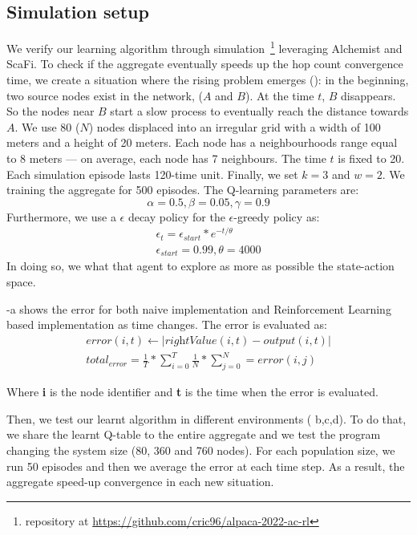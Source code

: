 \documentclass[conference]{IEEEtran}
\begin{document}
\subsection{Simulation setup}
We verify our learning algorithm through simulation~\footnote{repository at \url{https://github.com/cric96/alpaca-2022-ac-rl}} leveraging Alchemist and ScaFi.
 To check if the aggregate eventually speeds up the hop count convergence time, we create a situation where the rising problem emerges ():
 in the beginning, two source nodes exist in the network, ($A$ and $B$).
 At the time $t$, $B$ disappears. So the nodes near $B$ start a slow process
 to eventually reach the distance towards $A$.
%
We use 80 ($N$) nodes displaced into an irregular grid with a width of 100 meters and a height of 20 meters. 
 Each node has a neighbourhoods range equal to 8 meters --- on average, each node has 7 neighbours. 
 The time $t$ is fixed to 20.
 Each simulation episode lasts 120-time unit. Finally, we set $k = 3$ and $w = 2$.
% 
We training the aggregate for 500 episodes.
 The Q-learning parameters are:
$$ 
\alpha = 0.5,
\beta = 0.05,
\gamma = 0.9
$$
Furthermore, we use a $\epsilon$ decay policy for the $\epsilon$-greedy policy as:
\begin{equation*}
  \begin{array}{l}
    \epsilon_t = \epsilon_{start} * e^{-t/\theta}\\ 
    \epsilon_{start }= 0.99, \theta=4000
  \end{array}
\end{equation*}
In doing so, we what that agent to explore as more as possible the state-action space.

-a shows the error for both naive implementation and Reinforcement Learning based implementation as time changes.
The error is evaluated as:
\begin{equation*}
  \begin{array}{l}
    error(i, t) \leftarrow  | \textit{rightValue}(i,t) - \textit{output}(i,t) | \\
    total_{error} = \frac{1}{T} * \sum_{i = 0}^T \frac{1}{N} * \sum_{j = 0}^N = error(i, j)
  \end{array}
\end{equation*}

Where \textbf{i} is the node identifier and \textbf{t} is the time when the error is evaluated.
%

Then, we test our learnt algorithm in different environments ( b,c,d). To do that, we share the learnt Q-table to the 
entire aggregate and we test the program changing the system size (80, 360 and 760 nodes).
For each population size, we run 50 episodes and then we average the error at each time step. 
As a result, the aggregate speed-up convergence in each new situation.
\end{document}
